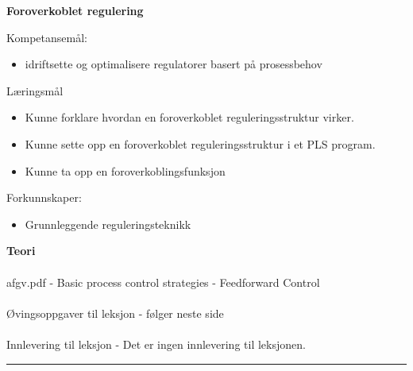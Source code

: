 \centerline\textbf{Foroverkoblet regulering}
\bigskip
Kompetansemål:
\begin{itemize}[noitemsep]
	\item idriftsette og optimalisere regulatorer basert på prosessbehov
\end{itemize}

	Læringsmål
	\begin{itemize}[noitemsep]
		\item Kunne forklare hvordan en foroverkoblet reguleringsstruktur virker. 
		\item Kunne sette opp en foroverkoblet reguleringsstruktur i et PLS program.
		\item Kunne ta opp en foroverkoblingsfunksjon
	\end{itemize}

	Forkunnskaper:


	\begin{itemize}[noitemsep]
		\item Grunnleggende reguleringsteknikk
	\end{itemize}

\textbf{Teori}\\\\
afgv.pdf - Basic process control strategies - Feedforward Control \\\\
Øvingsoppgaver til leksjon - følger neste side\\\\
Innlevering til leksjon - Det er ingen innlevering til leksjonen. 
\bigskip 
\hrule
\vfil \eject
